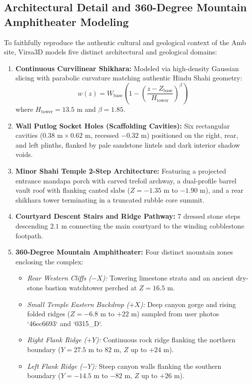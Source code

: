 \documentclass[11pt,a4paper]{article}
\begin{document}
\subsection{Architectural Detail and 360-Degree Mountain Amphitheater Modeling}
To faithfully reproduce the authentic cultural and geological context of the Amb site, Virsa3D models five distinct architectural and geological domains:
\begin{enumerate}
    \item \textbf{Continuous Curvilinear Shikhara:} Modeled via high-density Gaussian slicing with parabolic curvature matching authentic Hindu Shahi geometry:
    \begin{equation}
        w(z) = W_{\text{base}} \left( 1 - \left(\frac{z - Z_{\text{base}}}{H_{\text{tower}}}\right)^{\beta} \right)
        \label{eq:shikhara_curve}
    \end{equation}
    where $H_{\text{tower}} = 13.5\text{ m}$ and $\beta = 1.85$.
    \item \textbf{Wall Putlog Socket Holes (Scaffolding Cavities):} Six rectangular cavities ($0.38\text{ m} \times 0.62\text{ m}$, recessed $-0.32\text{ m}$) positioned on the right, rear, and left plinths, flanked by pale sandstone lintels and dark interior shadow voids.
    \item \textbf{Minor Shahi Temple 2-Step Architecture:} Featuring a projected entrance mandapa porch with carved trefoil archway, a dual-profile barrel vault roof with flanking canted slabs ($Z = -1.35\text{ m}$ to $-1.90\text{ m}$), and a rear shikhara tower terminating in a truncated rubble core summit.
    \item \textbf{Courtyard Descent Stairs and Ridge Pathway:} 7 dressed stone steps descending $2.1\text{ m}$ connecting the main courtyard to the winding cobblestone footpath.
    \item \textbf{360-Degree Mountain Amphitheater:} Four distinct mountain zones enclosing the complex:
    \begin{itemize}
        \item \textit{Rear Western Cliffs ($-X$):} Towering limestone strata and an ancient dry-stone bastion watchtower perched at $Z = 16.5\text{ m}$.
        \item \textit{Small Temple Eastern Backdrop ($+X$):} Deep canyon gorge and rising folded ridges ($Z = -6.8\text{ m}$ to $+22\text{ m}$) sampled from user photos `46ec6693` and `0315\_D`.
        \item \textit{Right Flank Ridge ($+Y$):} Continuous rock ridge flanking the northern boundary ($Y = 27.5\text{ m}$ to $82\text{ m}$, $Z$ up to $+24\text{ m}$).
        \item \textit{Left Flank Ridge ($-Y$):} Steep canyon walls flanking the southern boundary ($Y = -14.5\text{ m}$ to $-82\text{ m}$, $Z$ up to $+26\text{ m}$).
    \end{itemize}
\end{enumerate}
\end{document}

